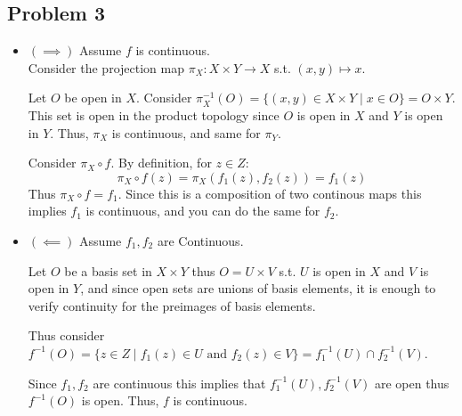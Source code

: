 \documentclass[12pt, letterpaper]{article}
\theoremstyle{definition}
\renewcommand{\t}[1]{\text{#1}}
\begin{document}
\subsection*{Problem 3}
\begin{itemize}
    \item $(\implies)$ Assume $f$ is continuous.\\
    Consider the projection map $\pi_X : X \times Y \to X$ s.t. $(x,y) \mapsto x$.

    Let $O$ be open in $X$. Consider $\pi_X^{-1}(O) = \{(x,y) \in X \times Y \mid x \in O\}=O \times Y$. This set is open in the product topology since $O$ is open in $X$ and $Y$ is open in $Y$. Thus, $\pi_X$ is continuous, and same for $\pi_Y$.

    Consider $\pi_X \circ f$. By definition, for $z \in Z$:
    \[\pi_X \circ f(z)=\pi_X(f_1(z),f_2(z))=f_1(z)\]
    Thus $\pi_X \circ f=f_1$. Since this is a composition of two continous maps this implies $f_1$ is continuous, and you can do the same for $f_2$.
    
    \item $(\impliedby)$ Assume $f_1,f_2$ are Continuous.
    
    Let $O$ be a basis set in $X \times Y$ thus $O=U \times V$ s.t. $U$ is open in $X$ and $V$ is open in $Y$, and since open sets are unions of basis elements, it is enough to verify continuity for the preimages of basis elements.

    Thus consider $f^{-1}(O)=\{z \in Z \mid f_1(z) \in U \t{ and } f_2(z) \in V\}=f_1^{-1}(U)\cap f_2^{-1}(V)$.

    Since $f_1,f_2$ are continuous this implies that $f_1^{-1}(U),f_2^{-1}(V)$ are open thus $f^{-1}(O)$ is open. Thus, $f$ is continuous.
\end{itemize}

\newpage
\end{document}
